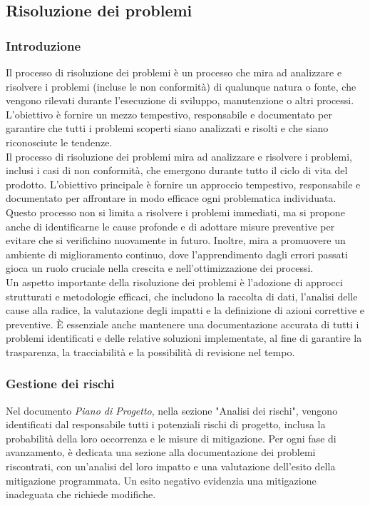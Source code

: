 \subsection{Risoluzione dei problemi}

\subsubsection{Introduzione}
Il processo di risoluzione dei problemi è un processo che mira ad analizzare e risolvere i problemi (incluse le non conformità) di qualunque natura o fonte, che vengono rilevati durante l'esecuzione di sviluppo, manutenzione o altri processi. \\
L'obiettivo è fornire un mezzo tempestivo, responsabile e documentato per garantire che tutti i problemi scoperti siano analizzati e risolti e che siano riconosciute le tendenze. \\
Il processo di risoluzione dei problemi mira ad analizzare e risolvere i problemi, inclusi i casi di non conformità, che emergono durante tutto il ciclo di vita del prodotto. L'obiettivo principale è fornire un approccio tempestivo, responsabile e documentato per affrontare in modo efficace ogni problematica individuata. \\
Questo processo non si limita a risolvere i problemi immediati, ma si propone anche di identificarne le cause profonde e di adottare misure preventive per evitare che si verifichino nuovamente in futuro. Inoltre, mira a promuovere un ambiente di miglioramento continuo, dove l'apprendimento dagli errori passati gioca un ruolo cruciale nella crescita e nell'ottimizzazione dei processi. \\
Un aspetto importante della risoluzione dei problemi è l'adozione di approcci strutturati e metodologie efficaci, che includono la raccolta di dati, l'analisi delle cause alla radice, la valutazione degli impatti e la definizione di azioni correttive e preventive. È essenziale anche mantenere una documentazione accurata di tutti i problemi identificati e delle relative soluzioni implementate, al fine di garantire la trasparenza, la tracciabilità e la possibilità di revisione nel tempo.

\subsubsection{Gestione dei rischi}
Nel documento \textit{Piano di Progetto}, nella sezione "Analisi dei rischi", vengono identificati dal responsabile tutti i potenziali rischi di progetto, inclusa la probabilità della loro occorrenza e le misure di mitigazione. Per ogni fase di avanzamento, è dedicata una sezione alla documentazione dei problemi riscontrati, con un'analisi del loro impatto e una valutazione dell'esito della mitigazione programmata. Un esito negativo evidenzia una mitigazione inadeguata che richiede modifiche.


